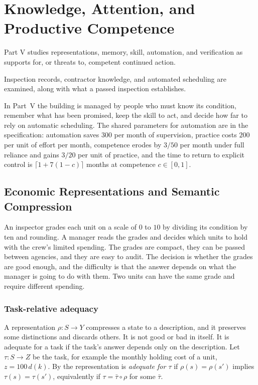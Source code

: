 \part{Knowledge, Attention, and Productive Competence}
\label{part:V}

Part V studies representations, memory, skill, automation, and verification as supports for, or threats to, competent continued action.

\begin{housing}Inspection records, contractor knowledge, and automated scheduling are examined, along with what a passed inspection establishes.\end{housing}


In Part~V the building is managed by people who must know its condition, remember what has been promised, keep the skill to act, and decide how far to rely on automatic scheduling. The shared parameters for automation are in the specification: automation saves $300$ per month of supervision, practice costs $200$ per unit of effort per month, competence erodes by $3/50$ per month under full reliance and gains $3/20$ per unit of practice, and the time to return to explicit control is $\lceil 1+7(1-c)\rceil$ months at competence $c\in[0,1]$.

\chapter{Economic Representations and Semantic Compression}\label{ch:21}

An inspector grades each unit on a scale of $0$ to $10$ by dividing its condition by ten and rounding. A manager reads the grades and decides which units to hold with the crew's limited spending. The grades are compact, they can be passed between agencies, and they are easy to audit. The decision is whether the grades are good enough, and the difficulty is that the answer depends on what the manager is going to do with them. Two units can have the same grade and require different spending.

\section{Task-relative adequacy}

A representation $\rho:S\to Y$ compresses a state to a description, and it preserves some distinctions and discards others. It is not good or bad in itself. It is adequate for a task if the task's answer depends only on the description. Let $\tau:S\to Z$ be the task, for example the monthly holding cost of a unit, $z=100\,d(k)$. By  the representation is \emph{adequate for $\tau$} if $\rho(s)=\rho(s')$ implies $\tau(s)=\tau(s')$, equivalently if $\tau=\bar\tau\circ\rho$ for some $\bar\tau$.


